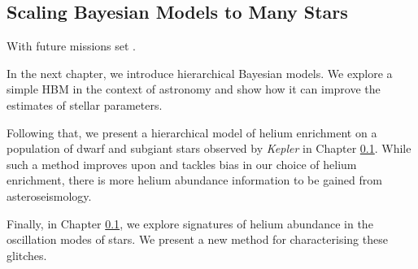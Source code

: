 \subsection{Scaling Bayesian Models to Many Stars}

With future missions set . 

In the next chapter, we introduce hierarchical Bayesian models. We explore a simple HBM in the context of astronomy and show how it can improve the estimates of stellar parameters.

Following that, we present a hierarchical model of helium enrichment on a population of dwarf and subgiant stars observed by \emph{Kepler} in Chapter \ref{}. While such a method improves upon and tackles bias in our choice of helium enrichment, there is more helium abundance information to be gained from asteroseismology.

Finally, in Chapter \ref{}, we explore signatures of helium abundance in the oscillation modes of stars. We present a new method for characterising these glitches.
